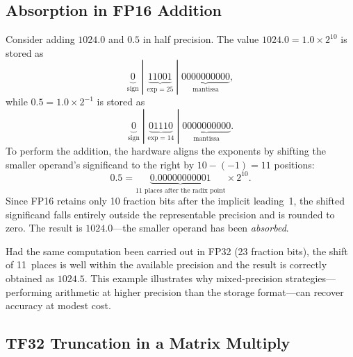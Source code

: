 \subsection{Absorption in FP16 Addition}\label{app:fp16-absorption}

Consider adding $1024.0$ and $0.5$ in half precision.
The value $1024.0 = 1.0 \times 2^{10}$ is stored as
\[
    \underbrace{0}_{\text{sign}} \;|\; \underbrace{11001}_{\text{exp}=25} \;|\; \underbrace{0000000000}_{\text{mantissa}},
\]
while $0.5 = 1.0 \times 2^{-1}$ is stored as
\[
    \underbrace{0}_{\text{sign}} \;|\; \underbrace{01110}_{\text{exp}=14} \;|\; \underbrace{0000000000}_{\text{mantissa}}.
\]
To perform the addition, the hardware aligns the exponents by shifting the smaller operand's significand to the right by $10 - (-1) = 11$ positions:
\[
    0.5 = \underbrace{0.00000000001}_{\text{11 places after the radix point}} \times 2^{10}.
\]
Since FP16 retains only 10 fraction bits after the implicit leading~1, the shifted significand falls entirely outside the representable precision and is rounded to zero. The result is $1024.0$---the smaller operand has been \emph{absorbed}.

Had the same computation been carried out in FP32 (23 fraction bits), the shift of 11~places is well within the available precision and the result is correctly obtained as $1024.5$. This example illustrates why mixed-precision strategies---performing arithmetic at higher precision than the storage format---can recover accuracy at modest cost.

\subsection{TF32 Truncation in a Matrix Multiply}\label{app:tf32-example}

